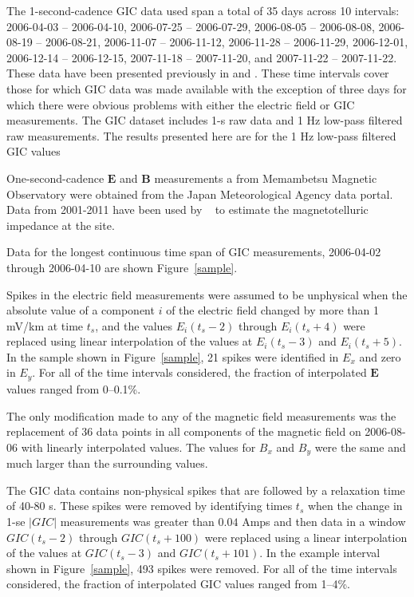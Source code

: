 \documentclass[draft,linenumbers]{agujournal2018}
\begin{document}
The 1-second-cadence GIC data used span a total of 35 days across 10 intervals: 2006-04-03 -- 2006-04-10, 2006-07-25 -- 2006-07-29, 2006-08-05 -- 2006-08-08, 2006-08-19 -- 2006-08-21, 2006-11-07 -- 2006-11-12, 2006-11-28 -- 2006-11-29, 2006-12-01, 2006-12-14 -- 2006-12-15, 2007-11-18 -- 2007-11-20, and 2007-11-22 -- 2007-11-22. These data have been presented previously in \citet{Watari2009} and \cite{Watari2015}. These time intervals cover those for which GIC data was made available with the exception of three days for which there were obvious problems with either the electric field or GIC measurements. The GIC dataset includes 1-s raw data and 1 Hz low-pass filtered raw measurements. The results presented here are for the 1 Hz low-pass filtered GIC values

One-second-cadence $\mathbf{E}$ and $\mathbf{B}$ measurements a from Memambetsu Magnetic Observatory were obtained from the Japan Meteorological Agency data portal. Data from 2001-2011 have been used by ~\cite{Fujii2015} to estimate the magnetotelluric impedance at the site.

Data for the longest continuous time span of GIC measurements, 2006-04-02 through 2006-04-10 are shown Figure~\ref{sample}. 

Spikes in the electric field measurements were assumed to be unphysical when the absolute value of a component $i$ of the electric field changed by more than 1 mV/km at time $t_s$, and the values $E_i(t_s-2)$ through $E_i(t_s+4)$ were replaced using linear interpolation of the values at $E_i(t_s-3)$ and $E_i(t_s + 5)$. In the sample shown in Figure~\ref{sample}, 21 spikes were identified in $E_x$ and zero in $E_y$. For all of the time intervals considered, the fraction of interpolated $\mathbf{E}$ values ranged from 0--0.1\%.

The only modification made to any of the magnetic field measurements was the replacement of 36 data points in all components of the magnetic field on 2006-08-06 with linearly interpolated values. The values for $B_x$ and $B_y$ were the same and much larger than the surrounding values.

The GIC data contains non-physical spikes that are followed by a relaxation time of 40-80 s. These spikes were removed by identifying times $t_s$ when the change in 1-se $|GIC|$ measurements was greater than $0.04$ Amps and then data in a window $GIC(t_s-2)$ through $GIC(t_s+100)$ were replaced using a linear interpolation of the values at $GIC(t_s-3)$ and $GIC(t_s + 101)$. In the example interval shown in Figure~\ref{sample}, 493 spikes were removed. For all of the time intervals considered, the fraction of interpolated GIC values ranged from 1--4\%.
\end{document}
